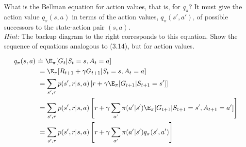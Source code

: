 
\begin{exercise}[Exercise 3.17]

What is the Bellman equation for action values, that is, for $q_\pi$? It must give
the action value $q_\pi(s,a)$ in terms of the action values, $q_\pi(s',a')$, of
possible successors to the state-action pair $(s,a)$. \\
\textit{Hint:} The backup diagram to the right corresponds to this equation.
Show the sequence of equations analogous to (3.14), but for action values.

\end{exercise}


\begin{solution}

\begin{align*}
  q_\pi(s,a) \ &\dot = \ \E_\pi[G_t | S_t = s, A_t = a] \\
  &= \E_\pi[R_{t+1} +  \gamma G_{t+1} | S_t = s, A_t = a] \\
  &= \sum_{s',r} p(s',r|s,a)\left[r + \gamma \E_\pi[G_{t+1} | S_{t+1} = s']\right] \\
  &= \sum_{s',r} p(s',r|s,a)\left[r + \gamma \sum_{a'} \pi(a'|s')\E_\pi[G_{t+1} | S_{t+1} = s', A_{t+1} = a']\right] \\
  &= \sum_{s',r} p(s',r|s,a)\left[r + \gamma \sum_{a'} \pi(a'|s') q_\pi(s',a')\right] \\
\end{align*}

\end{solution}

